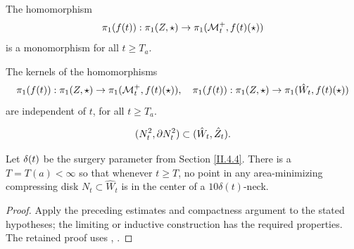 \begin{proposition}
  \label{prop:kl-incompressibility-cuspidal-tori-incompressibility-cuspidal-tori-proposition}

\label{propincompressible}
The homomorphism
\begin{equation} \label{injeqn}
\pi_1(f(t)):\pi_1(Z,\star)\rightarrow \pi_1({\mathcal M}_t^+,f(t)(\star))
\end{equation}
is a monomorphism for all $t\geq T_a$.
\end{proposition}

\begin{lemma}
  \label{lem:kl-incompressibility-cuspidal-tori-incompressibility-cuspidal-tori-lemma}
 \label{stablelemma}
The kernels of the homomorphisms
\begin{equation}
\label{eqnpi1inclusion}
\pi_1(f(t)):\pi_1(Z,\star)\rightarrow \pi_1({\mathcal M}_t^+,f(t)(\star)),\quad
\pi_1(f(t)):\pi_1(Z,\star)\rightarrow \pi_1(\hat W_t,f(t)(\star))
\end{equation}
are independent of $t$, for all $t\geq T_a$.
\end{lemma}

\begin{equation}
(N^2_t,\partial N^2_t)\subset (\hat W_t,\hat Z_t).
\end{equation}

\begin{lemma}
  \label{lem:kl-incompressibility-cuspidal-tori-existence-ricci-flow-surgery}

\label{lemavoids}
Let $\delta(t)$ be the surgery parameter from
Section \ref{II.4.4}. There is a $T = T(a) < \infty$ so that whenever $t \ge T$,
no point in any area-minimizing compressing disk  $N_t\subset \hat W_t$ is in the
center of a $10 \delta(t)$-neck.
\end{lemma}

\begin{proof}
\sketch Apply the preceding estimates and compactness argument to the stated hypotheses; the limiting or inductive construction has the required properties.
The retained proof uses \cite{schoen}, \cite[Theorem 2]{schoenyau}.
\end{proof}

